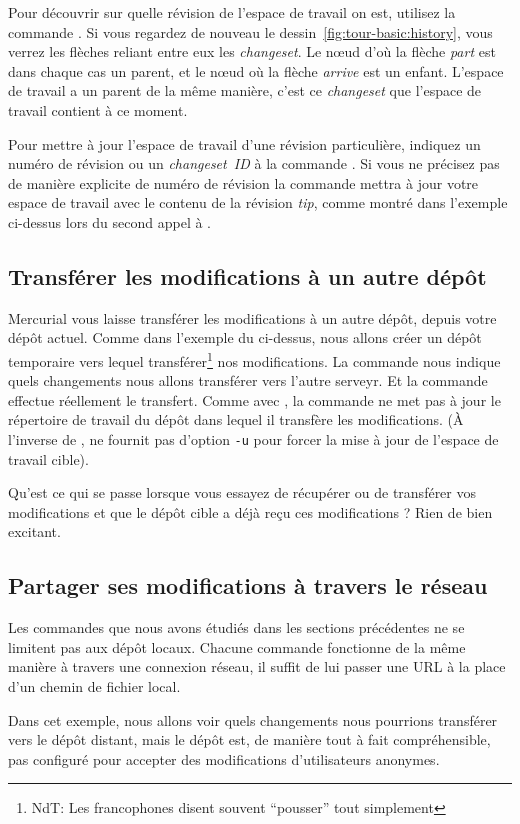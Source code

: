 Pour découvrir sur quelle révision de l'espace de travail on est, utilisez
la commande . 
Si vous regardez de nouveau le dessin~\ref{fig:tour-basic:history}, vous
verrez les flèches reliant entre eux les \textit{changeset}. Le nœud 
d'où la flèche \emph{part} est dans chaque cas un parent, 
et le nœud où la flèche \emph{arrive} est un enfant. 
L'espace de travail a un parent de la même manière, c'est ce \textit{changeset} 
que l'espace de travail contient à ce moment.

Pour mettre à jour l'espace de travail d'une révision particulière, 
indiquez un numéro de révision ou un \textit{changeset~ID} à la commande 
.
Si vous ne précisez pas de manière explicite de numéro de révision
la commande  mettra à jour votre espace de travail avec
le contenu de la révision \textit{tip}, comme montré dans l'exemple 
ci-dessus lors du second appel à .

\subsection{Transférer les modifications à un autre dépôt}

Mercurial vous laisse transférer les modifications à un autre
dépôt, depuis votre dépôt actuel. Comme dans l'exemple du 
 ci-dessus, nous allons créer un dépôt temporaire
vers lequel transférer\footnote{NdT: Les francophones disent souvent 
``pousser'' tout simplement} nos modifications.
La commande  nous indique quels changements nous
allons transférer vers l'autre serveyr.
Et la commande  effectue réellement le transfert.
Comme avec , la commande  ne met pas à jour
le répertoire de travail du dépôt dans lequel il transfère les 
modifications. (À l'inverse de ,  ne fournit
pas d'option \texttt{-u} pour forcer la mise à jour de l'espace
de travail cible).

Qu'est ce qui se passe lorsque vous essayez de récupérer ou de transférer
vos modifications et que le dépôt cible a déjà reçu ces modifications ? 
Rien de bien excitant.

\subsection{Partager ses modifications à travers le réseau}

Les commandes que nous avons étudiés dans les sections précédentes
ne se limitent pas aux dépôt locaux. Chacune commande fonctionne de la même
manière à travers une connexion réseau, il suffit de lui passer une 
URL à la place d'un chemin de fichier local.

Dans cet exemple, nous allons voir quels changements nous pourrions
transférer vers le dépôt distant, mais le dépôt est, de manière tout
à fait compréhensible, pas configuré pour accepter des modifications
d'utilisateurs anonymes.

